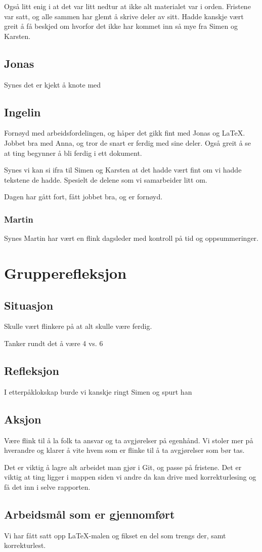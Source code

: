 \documentclass[DIV=calc, paper=a4, fontsize=12pt]{scrartcl}
\begin{document}
Også litt enig i at det var litt nedtur at ikke alt materialet var i orden. Fristene var satt, og alle sammen har glemt å skrive deler av sitt. Hadde kanskje vært greit å få beskjed om hvorfor det ikke har kommet inn så mye fra Simen og Karsten.

\subsection{Jonas}
Synes det er kjekt å knote med 

\subsection{Ingelin}
Fornøyd med arbeidsfordelingen, og håper det gikk fint med Jonas og \LaTeX. Jobbet bra med Anna, og tror de snart er ferdig med sine deler. Også greit å se at ting begynner å bli ferdig i ett dokument.

Synes vi kan si ifra til Simen og Karsten at det hadde vært fint om vi hadde tekstene de hadde. Spesielt de delene som vi samarbeider litt om.

Dagen har gått fort, fått jobbet bra, og er fornøyd.

\subsubsection{Martin}
Synes Martin har vært en flink dagsleder med kontroll på tid og oppsummeringer.

\section{Grupperefleksjon}
\subsection{Situasjon}
Skulle vært flinkere på at alt skulle være ferdig.

Tanker rundt det å være 4 vs. 6

\subsection{Refleksjon}
I etterpåklokskap burde vi kanskje ringt Simen og spurt han

\subsection{Aksjon}
Være flink til å la folk ta ansvar og ta avgjørelser på egenhånd. Vi stoler mer på hverandre og klarer å vite hvem som er flinke til å ta avgjørelser som bør tas.

Det er viktig å lagre alt arbeidet man gjør i Git, og passe på fristene. Det er viktig at ting ligger i mappen siden vi andre da kan drive med korrekturlesing og få det inn i selve rapporten.

\subsection{Arbeidsmål som er gjennomført}
Vi har fått satt opp \LaTeX-malen og fikset en del som trengs der, samt korrekturlest.
\end{document}
